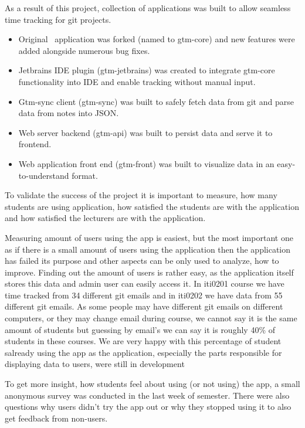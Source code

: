 As a result of this project, collection of applications was built to allow seamless time tracking for git projects.
\begin{itemize}
    \item Original~ application was forked (named to gtm-core) and new features were added
    alongside numerous bug fixes.
    \item Jetbrains IDE plugin (gtm-jetbrains) was created to integrate gtm-core functionality into IDE and enable tracking without manual input.
    \item Gtm-sync client (gtm-sync) was built to safely fetch data from git and parse data from notes into JSON.
    \item Web server backend (gtm-api) was built to persist data and serve it to frontend.
    \item Web application front end (gtm-front) was built to visualize data in an easy-to-understand format.
\end{itemize}

To validate the success of the project it is important to measure, how many students are using application,
how satisfied the students are with the application and how satisfied the lecturers are with the application.

Measuring amount of users using the app is easiest, but the most important one as if there is a small amount of users using
the application then the application has failed its purpose and other aspects can be only used to analyze, how
to improve.
Finding out the amount of users is rather easy, as the application itself stores this data and admin user can easily access it.
In iti0201 course we have time tracked from 34 different git emails and in iti0202 we have data from 55 different git emails.
As some people may have different git emails on different computers, or they may change email during course, we cannot say it
is the same amount of students but guessing by email's we can say it is roughly 40\% of students in these courses.
We are very happy with this percentage of student salready using the app as the application, especially the parts
responsible for displaying data to users, were still in development

To get more insight, how students feel about using (or not using) the app, a small anonymous survey was conducted in the last week of semester.
There were also questions why users didn't try the app out or why they stopped using it to also get feedback from non-users.

